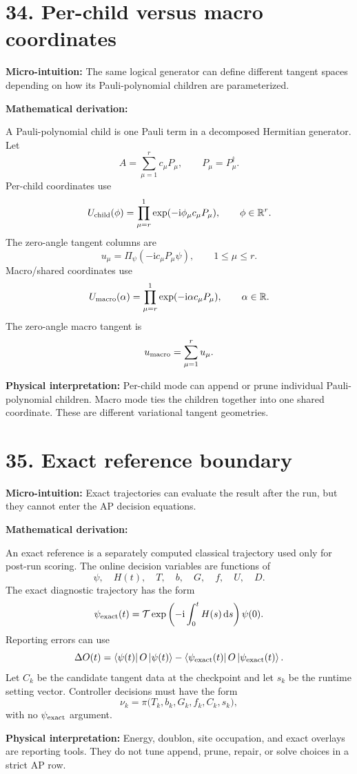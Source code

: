 \documentclass[10pt,twocolumn]{article}
\newcommand{\ii}{\mathrm{i}}
\newcommand{\ket}[1]{\left|#1\right\rangle}
\newcommand{\bra}[1]{\left\langle#1\right|}
\newcommand{\R}{\mathbb R}
\newcommand{\dd}{\mathrm d}
\newcommand{\micro}[1]{%
  \par\smallskip
  \noindent\textcolor{deepblue}{\textbf{Micro-intuition:}} #1
  \par\smallskip}
\newcommand{\deriv}{%
  \par\noindent\textcolor{deepviolet}{\textbf{Mathematical derivation:}}\par\vspace{-1mm}}
\newcommand{\phys}[1]{%
  \par\smallskip
  \noindent\textcolor{deepgreen}{\textbf{Physical interpretation:}} #1
  \par\smallskip}
\begin{document}
\section*{34. Per-child versus macro coordinates}

\micro{The same logical generator can define different tangent spaces depending
on how its Pauli-polynomial children are parameterized.}

\deriv
A Pauli-polynomial child is one Pauli term in a decomposed Hermitian generator.
Let
\[
A=\sum_{\mu=1}^{r}c_\mu P_\mu,
\qquad
P_\mu=P_\mu^\dagger.
\]
Per-child coordinates use
\[
U_{\rm child}(\phi)
=
\prod_{\mu=r}^{1}\exp(-\ii\phi_\mu c_\mu P_\mu),
\qquad
\phi\in\R^r.
\]
The zero-angle tangent columns are
\[
u_\mu=\Pi_\psi(-\ii c_\mu P_\mu\psi),
\qquad
1\le\mu\le r.
\]
Macro/shared coordinates use
\[
U_{\rm macro}(\alpha)
=
\prod_{\mu=r}^{1}\exp(-\ii\alpha c_\mu P_\mu),
\qquad
\alpha\in\R.
\]
The zero-angle macro tangent is
\[
u_{\rm macro}
=
\sum_{\mu=1}^{r}u_\mu.
\]

\phys{Per-child mode can append or prune individual Pauli-polynomial children.
Macro mode ties the children together into one shared coordinate. These are
different variational tangent geometries.}

\section*{35. Exact reference boundary}

\micro{Exact trajectories can evaluate the result after the run, but they cannot
enter the AP decision equations.}

\deriv
An exact reference is a separately computed classical trajectory used only for
post-run scoring. The online decision variables are functions of
\[
\psi,\quad H(t),\quad T,\quad b,\quad G,\quad f,\quad U,\quad D.
\]
The exact diagnostic trajectory has the form
\[
\psi_{\rm exact}(t)
=
\mathcal T\exp\left(-\ii\int_0^tH(s)\,\dd s\right)\psi(0).
\]
Reporting errors can use
\[
\Delta O(t)
=
\bra{\psi(t)}O\ket{\psi(t)}
-
\bra{\psi_{\rm exact}(t)}O\ket{\psi_{\rm exact}(t)}.
\]
Let \(C_k\) be the candidate tangent data at the checkpoint and let \(s_k\) be
the runtime setting vector. Controller decisions must have the form
\[
\nu_k
=
\pi\bigl(T_k,b_k,G_k,f_k,C_k,s_k\bigr),
\]
with no \(\psi_{\rm exact}\) argument.

\phys{Energy, doublon, site occupation, and exact overlays are reporting tools.
They do not tune append, prune, repair, or solve choices in a strict AP row.}
\end{document}
